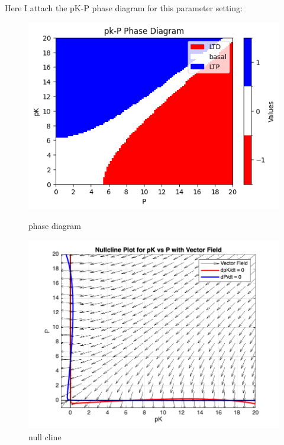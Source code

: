 \documentclass{article}
\begin{document}
Here I attach the pK-P phase diagram for this parameter setting:\\
\begin{figure}[h]
    \centering
    \begin{minipage}[b]{0.35\textwidth}
        \includegraphics[width=1\textwidth]{phase_diagram_1.png}
        \caption{phase diagram}
        \label{fig:image1}
    \end{minipage}
    \hfill %
    \begin{minipage}[b]{0.35\textwidth}
        \includegraphics[width=\textwidth]{null_cline_with_vector_field.png}
        \caption{null cline}
        \label{fig:image2}
    \end{minipage}
\end{figure}\\
\end{document}
